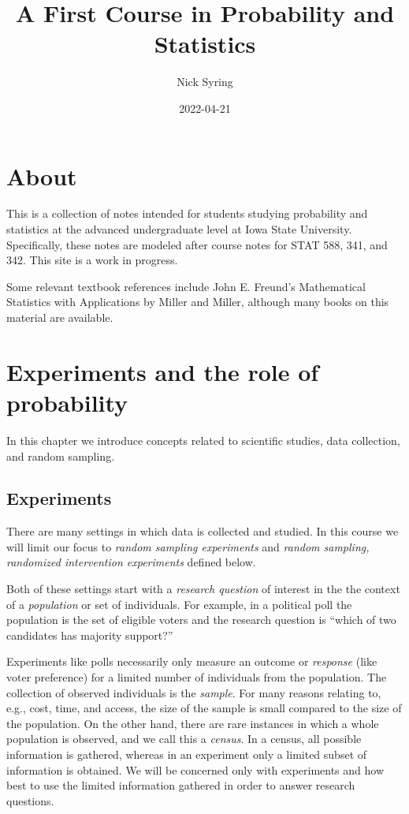 \documentclass[
]{book}
\title{A First Course in Probability and Statistics}
\author{Nick Syring}
\date{2022-04-21}
\begin{document}
\maketitle

{
\setcounter{tocdepth}{1}
\tableofcontents
}
\hypertarget{about}{%
\chapter{About}\label{about}}

This is a collection of notes intended for students studying probability and statistics at the advanced undergraduate level at Iowa State University. Specifically, these notes are modeled after course notes for STAT 588, 341, and 342. This site is a work in progress.

Some relevant textbook references include John E. Freund's Mathematical Statistics with Applications by Miller and Miller, although many books on this material are available.

\hypertarget{experiments-and-the-role-of-probability}{%
\chapter{Experiments and the role of probability}\label{experiments-and-the-role-of-probability}}

In this chapter we introduce concepts related to scientific studies, data collection, and random sampling.

\hypertarget{experiments}{%
\section{Experiments}\label{experiments}}

There are many settings in which data is collected and studied. In this course we will limit our focus to \emph{random sampling experiments} and \emph{random sampling, randomized intervention experiments} defined below.

Both of these settings start with a \emph{research question} of interest in the the context of a \emph{population} or set of individuals. For example, in a political poll the population is the set of eligible voters and the research question is ``which of two candidates has majority support?''

Experiments like polls necessarily only measure an outcome or \emph{response} (like voter preference) for a limited number of individuals from the population. The collection of observed individuals is the \emph{sample}. For many reasons relating to, e.g., cost, time, and access, the size of the sample is small compared to the size of the population. On the other hand, there are rare instances in which a whole population is observed, and we call this a \emph{census}. In a census, all possible information is gathered, whereas in an experiment only a limited subset of information is obtained. We will be concerned only with experiments and how best to use the limited information gathered in order to answer research questions.
\end{document}
